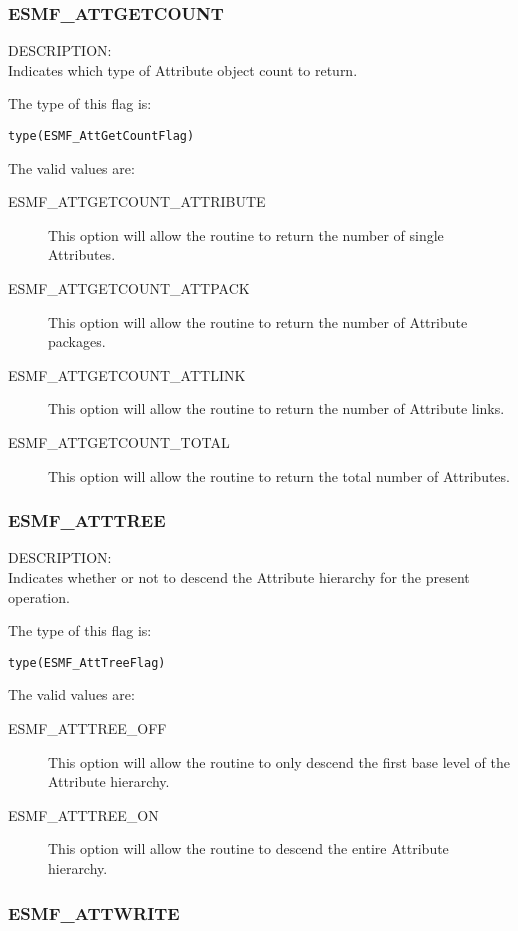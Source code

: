 
\subsubsection{ESMF\_ATTGETCOUNT}
\label{const:attgetcount}

{\sf DESCRIPTION:\\}
Indicates which type of Attribute object count to return.

The type of this flag is:

{\tt type(ESMF\_AttGetCountFlag)}

The valid values are:
\begin{description}
	\item[ESMF\_ATTGETCOUNT\_ATTRIBUTE]
	This option will allow the routine to return the number of single Attributes.
	\item[ESMF\_ATTGETCOUNT\_ATTPACK]
	This option will allow the routine to return the number of Attribute packages.
	\item[ESMF\_ATTGETCOUNT\_ATTLINK]
	This option will allow the routine to return the number of Attribute links.
	\item[ESMF\_ATTGETCOUNT\_TOTAL]
	This option will allow the routine to return the total number of Attributes.
\end{description}

\subsubsection{ESMF\_ATTTREE}
\label{const:atttree}

{\sf DESCRIPTION:\\}
Indicates whether or not to descend the Attribute hierarchy for the present operation.

The type of this flag is:

{\tt type(ESMF\_AttTreeFlag)}

The valid values are:
\begin{description}
	\item[ESMF\_ATTTREE\_OFF]
	This option will allow the routine to only descend the first base level of the Attribute hierarchy.
	\item[ESMF\_ATTTREE\_ON]
	This option will allow the routine to descend the entire Attribute hierarchy.
\end{description}

\subsubsection{ESMF\_ATTWRITE}
\label{const:attwrite}

